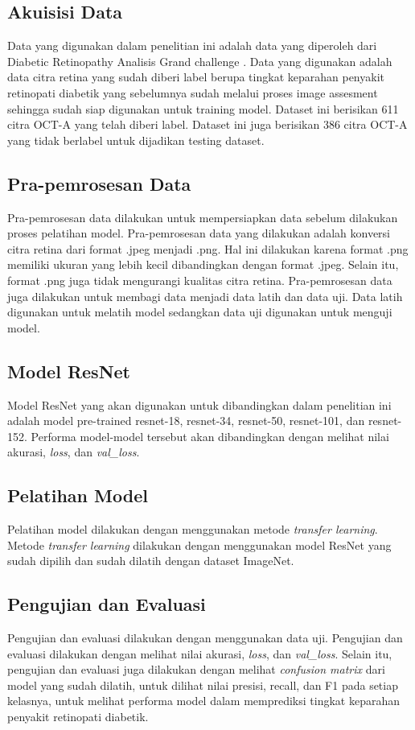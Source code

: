 \subsection{Akuisisi Data}
Data yang digunakan dalam penelitian ini adalah data yang diperoleh dari Diabetic Retinopathy Analisis Grand challenge \parencite{drac_challenge_2023_10280359}. Data yang digunakan adalah data citra retina yang sudah diberi label berupa tingkat keparahan penyakit retinopati diabetik yang sebelumnya sudah melalui proses image assesment sehingga sudah siap digunakan untuk training model. Dataset ini berisikan 611 citra OCT-A yang telah diberi label. Dataset ini juga berisikan 386 citra OCT-A yang tidak berlabel untuk dijadikan testing dataset.

\subsection{Pra-pemrosesan Data}
Pra-pemrosesan data dilakukan untuk mempersiapkan data sebelum dilakukan proses pelatihan model. Pra-pemrosesan data yang dilakukan adalah konversi citra retina dari format .jpeg menjadi .png. Hal ini dilakukan karena format .png memiliki ukuran yang lebih kecil dibandingkan dengan format .jpeg. Selain itu, format .png juga tidak mengurangi kualitas citra retina. Pra-pemrosesan data juga dilakukan untuk membagi data menjadi data latih dan data uji. Data latih digunakan untuk melatih model sedangkan data uji digunakan untuk menguji model.

\subsection{ Model ResNet}
Model ResNet yang akan digunakan untuk dibandingkan dalam penelitian ini adalah model pre-trained resnet-18, resnet-34, resnet-50, resnet-101, dan resnet-152. Performa model-model tersebut akan dibandingkan dengan melihat nilai akurasi, \emph{loss}, dan \emph{val\_loss}.

\subsection{Pelatihan Model}
Pelatihan model dilakukan dengan menggunakan metode \emph{transfer learning}. Metode \emph{transfer learning} dilakukan dengan menggunakan model ResNet yang sudah dipilih dan sudah dilatih dengan dataset ImageNet.

\subsection{Pengujian dan Evaluasi}
Pengujian dan evaluasi dilakukan dengan menggunakan data uji. Pengujian dan evaluasi dilakukan dengan melihat nilai akurasi, \emph{loss}, dan \emph{val\_loss}. Selain itu, pengujian dan evaluasi juga dilakukan dengan melihat \emph{confusion matrix} dari model yang sudah dilatih, untuk dilihat nilai presisi, recall, dan F1 pada setiap kelasnya, untuk melihat performa model dalam memprediksi tingkat keparahan penyakit retinopati diabetik.

